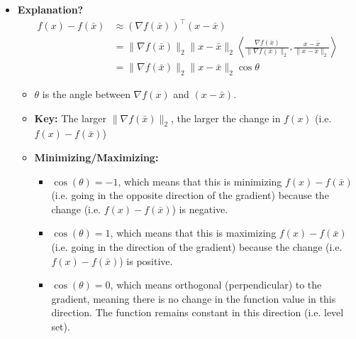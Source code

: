 \begin{intuition}
\begin{itemize}
                \begin{itemize}
                    \item \textbf{Explanation?}
                    \begin{align*}
                        f(x) - f(\bar{x}) &\approx (\nabla f(\bar{x}))^\top (x - \bar{x})\\
                        &= \| \nabla f(\bar{x}) \|_2 \| x - \bar{x} \|_2 \left\langle \frac{\nabla f(\bar{x})}{\| \nabla f(\bar{x}) \|_2}, \frac{x - \bar{x}}{\| x - \bar{x} \|_2} \right\rangle\\
                        &= \| \nabla f(\bar{x}) \|_2 \| x - \bar{x} \|_2 \cos \theta
                    \end{align*}
                    \begin{itemize}
                        \item $\theta$ is the angle between $\nabla f(x)$ and $(x - \bar{x})$.
                        \item \textbf{Key:} The larger $\|\nabla f(\bar{x})\|_2$, the larger the change in $f(x)$ (i.e. $f(x)-f(\bar{x})$)
                        \item \textbf{Minimizing/Maximizing:} 
                        \begin{itemize}
                            \item $\cos(\theta)=-1$, which means that this is minimizing $f(x)-f(\bar{x})$ (i.e. going in the opposite direction of the gradient) because the change (i.e. $f(x)-f(\bar{x})$) is negative.
                            \item $\cos(\theta)=1$, which means that this is maximizing $f(x)-f(\bar{x})$ (i.e. going in the direction of the gradient) because the change (i.e. $f(x)-f(\bar{x})$) is positive.
                            \item $\cos(\theta) = 0$, which means orthogonal (perpendicular) to the gradient, meaning there is no change in the function value in this direction. The function remains constant in this direction (i.e. level set).
                        \end{itemize}
                    \end{itemize}
                \end{itemize}
        \end{itemize}
    \end{intuition}
    
